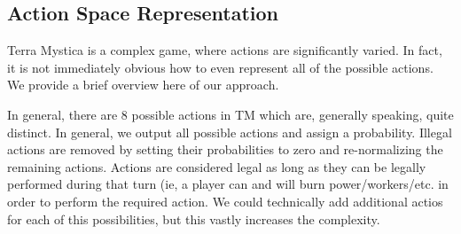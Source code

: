 \documentclass[10pt,twocolumn,letterpaper]{article}
\begin{document}
\subsection{Action Space Representation}
\label{section:action_space_representation}
Terra Mystica is a complex game, where actions are significantly varied. In fact, it is not immediately obvious how to even represent all of the possible actions. We provide a brief overview here of our approach.

In general, there are 8 possible actions in TM which are, generally speaking, quite distinct. In general, we output all possible actions and assign a probability. Illegal actions are removed by setting their probabilities to zero and re-normalizing the remaining actions. Actions are considered legal as long as they can be legally performed during that turn (ie, a player can and will burn power/workers/etc. in order to perform the required action. We could technically add additional actios for each of this possibilities, but this vastly increases the complexity.
\end{document}

